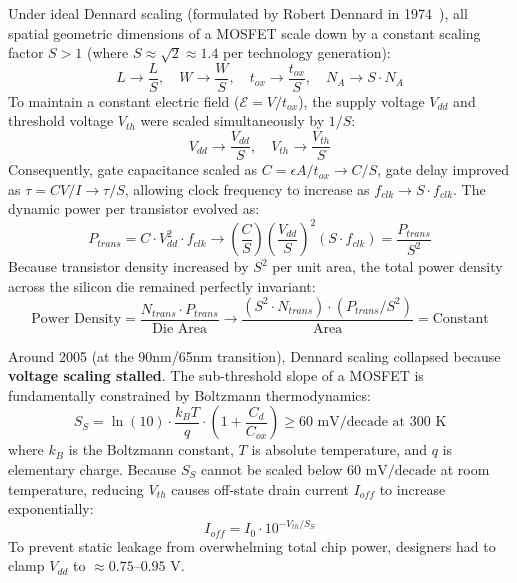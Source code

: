 Under ideal Dennard scaling (formulated by Robert Dennard in 1974~\cite{Dennard1974}), all spatial geometric dimensions of a MOSFET scale down by a constant scaling factor $S > 1$ (where $S \approx \sqrt{2} \approx 1.4$ per technology generation):
\begin{equation}
L \longrightarrow \frac{L}{S}, \quad W \longrightarrow \frac{W}{S}, \quad t_{ox} \longrightarrow \frac{t_{ox}}{S}, \quad N_A \longrightarrow S \cdot N_A
\end{equation}
To maintain a constant electric field ($\mathcal{E} = V / t_{ox}$), the supply voltage $V_{dd}$ and threshold voltage $V_{th}$ were scaled simultaneously by $1/S$:
\begin{equation}
V_{dd} \longrightarrow \frac{V_{dd}}{S}, \quad V_{th} \longrightarrow \frac{V_{th}}{S}
\end{equation}
Consequently, gate capacitance scaled as $C = \epsilon A / t_{ox} \to C/S$, gate delay improved as $\tau = C V / I \to \tau / S$, allowing clock frequency to increase as $f_{clk} \to S \cdot f_{clk}$. The dynamic power per transistor evolved as:
\begin{equation}
P_{trans} = C \cdot V_{dd}^2 \cdot f_{clk} \longrightarrow \left(\frac{C}{S}\right) \left(\frac{V_{dd}}{S}\right)^2 (S \cdot f_{clk}) = \frac{P_{trans}}{S^2}
\label{eq:ch6_dennard_power}
\end{equation}
Because transistor density increased by $S^2$ per unit area, the total power density across the silicon die remained perfectly invariant:
\begin{equation}
\text{Power Density} = \frac{N_{trans} \cdot P_{trans}}{\text{Die Area}} \longrightarrow \frac{(S^2 \cdot N_{trans}) \cdot (P_{trans} / S^2)}{\text{Area}} = \text{Constant}
\end{equation}

Around 2005 (at the 90nm/65nm transition), Dennard scaling collapsed because \textbf{voltage scaling stalled}. The sub-threshold slope of a MOSFET is fundamentally constrained by Boltzmann thermodynamics:
\begin{equation}
S_S = \ln(10) \cdot \frac{k_B T}{q} \cdot \left(1 + \frac{C_d}{C_{ox}}\right) \ge 60\text{ mV/decade at } 300\text{ K}
\label{eq:ch6_subthreshold_slope}
\end{equation}
where $k_B$ is the Boltzmann constant, $T$ is absolute temperature, and $q$ is elementary charge. Because $S_S$ cannot be scaled below $60\text{ mV/decade}$ at room temperature, reducing $V_{th}$ causes off-state drain current $I_{off}$ to increase exponentially:
\begin{equation}
I_{off} = I_0 \cdot 10^{-V_{th} / S_S}
\label{eq:ch6_ioff}
\end{equation}
To prevent static leakage from overwhelming total chip power, designers had to clamp $V_{dd}$ to $\approx 0.75$--$0.95\text{ V}$.

